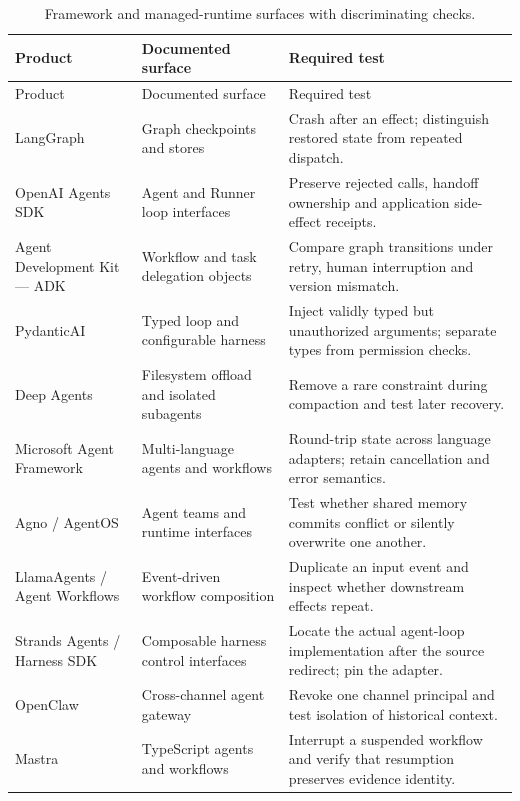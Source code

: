 \begingroup\setlength{\tabcolsep}{3pt}\small
\bookneedspace{.42\textheight}
\begin{longtable}{L{25mm}L{35mm}L{48mm}}
\caption{Framework and managed-runtime surfaces with discriminating checks.}\label{tab:C22:inventory}\\
\toprule Product & Documented surface & Required test \\
\midrule\endfirsthead
\toprule Product & Documented surface & Required test \\
\midrule\endhead
LangGraph\cite{executionproduct001} & Graph checkpoints and stores & Crash after an effect; distinguish restored state from repeated dispatch. \\
OpenAI Agents SDK\cite{executionproduct002} & Agent and Runner loop interfaces & Preserve rejected calls, handoff ownership and application side-effect receipts. \\
Agent Development Kit — ADK\cite{executionproduct003} & Workflow and task delegation objects & Compare graph transitions under retry, human interruption and version mismatch. \\
PydanticAI\cite{executionproduct004} & Typed loop and configurable harness & Inject validly typed but unauthorized arguments; separate types from permission checks. \\
Deep Agents\cite{executionproduct006} & Filesystem offload and isolated subagents & Remove a rare constraint during compaction and test later recovery. \\
Microsoft Agent Framework\cite{executionproduct007} & Multi-language agents and workflows & Round-trip state across language adapters; retain cancellation and error semantics. \\
Agno / AgentOS\cite{executionproduct010} & Agent teams and runtime interfaces & Test whether shared memory commits conflict or silently overwrite one another. \\
LlamaAgents / Agent Workflows\cite{executionproduct011} & Event-driven workflow composition & Duplicate an input event and inspect whether downstream effects repeat. \\
Strands Agents / Harness SDK\cite{executionproduct012} & Composable harness control interfaces & Locate the actual agent-loop implementation after the source redirect; pin the adapter. \\
OpenClaw\cite{executionproduct014} & Cross-channel agent gateway & Revoke one channel principal and test isolation of historical context. \\
Mastra\cite{executionproduct019} & TypeScript agents and workflows & Interrupt a suspended workflow and verify that resumption preserves evidence identity. \\

\end{longtable}
